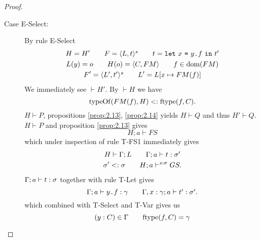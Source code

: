 \begin{proof}
\begin{description}
\begin{description}
\begin{description}
            \item[Case {\sc E-Select}:] By rule {\sc E-Select}
              \begin{equation} \label{eq:eselect1}
                \begin{gathered}
                  H = H' \quad\quad F = \mbox{$\langle L, t \rangle^s$} \quad\quad t =
                  \mbox{\mdseries\texttt{let}~$x$~\texttt{=}~$\mbox{\mdseries$y$\texttt{.}$f$}$~\texttt{in}~$t'$} \\
                  L(y) = o \quad\quad H(o) = \mbox{$\langle C, FM \rangle$} \quad\quad f \in \mbox{$\mathrm{dom}$}(FM)
                  \\
                  F' = \mbox{$\langle L', t' \rangle^s$} \quad\quad L' = L[x \mapsto FM(f)]
                \end{gathered}
              \end{equation}
              We immediately see $\vdash H'$. By $\vdash H$ we have
              \begin{equation} \label{eq:eselect2}
                \mbox{$\mathrm{typeOf}$}(FM(f), H) <: \mbox{$\mathrm{ftype}$}(f, C).
              \end{equation}
              $H \vdash P$, propositions \ref{prop:2.13}, \ref{prop:2.14} yields
              $H \vdash Q$ and thus $H' \vdash Q$.
              $H \vdash P$ and proposition \ref{prop:2.13} gives 
              \begin{equation} \label{eq:eselect3}
                H; a \vdash FS
              \end{equation}
              which under inspection of rule {\sc T-FS1} immediately gives
              \begin{equation} \label{eq:eselect4}
                \begin{gathered}
                  H \vdash \Gamma; L \quad\quad \mbox{$\Gamma;a\vdash t:\sigma'$} \\
                  \sigma' <: \sigma \quad\quad H; a \vdash^{s: \sigma} GS.
                \end{gathered}
              \end{equation}
              $\mbox{$\Gamma;a\vdash t:\sigma$}$ together with rule {\sc T-Let}
              gives
              \begin{equation} \label{eq:eselect5}
                \mbox{$\Gamma;a\vdash\mbox{\mdseries$y$\texttt{.}$f$}:\gamma$} \quad\quad
                \mbox{$\Gamma, x: \gamma;a\vdash t':\sigma'$}.
              \end{equation}
              which combined with {\sc T-Select} and {\sc T-Var} gives us
              \begin{equation} \label{eq:eselect6}
                (y: C) \in \Gamma \andalso \ftype(f, C) = \gamma

\end{equation}
\end{description}
\end{description}
\end{description}
\end{proof}
